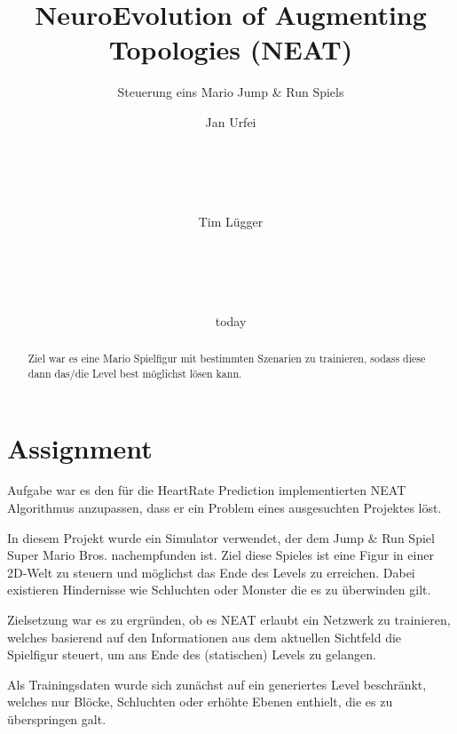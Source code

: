 \documentclass{hbrs-ecta-report}
\begin{document}

\title{NeuroEvolution of Augmenting Topologies (NEAT)}
\subtitle{Steuerung eins Mario Jump \& Run Spiels}

\author{
Jan Urfei\\
       \\
       \\
       \\
       \\
\and
	Tim Lügger\\
	\\
	\\
	\\
	\\
}
\date{today}
\maketitle
\begin{abstract}
Ziel war es eine Mario Spielfigur mit bestimmten Szenarien zu trainieren, sodass diese dann das/die Level best möglichst lösen kann.
\end{abstract}

\section{Assignment}
Aufgabe war es den für die HeartRate Prediction implementierten NEAT Algorithmus\cite{Stanley2002a} anzupassen, dass er ein Problem eines ausgesuchten Projektes löst.

In diesem Projekt wurde ein Simulator verwendet, der dem Jump \& Run Spiel Super Mario Bros. nachempfunden ist.
Ziel diese Spieles ist eine Figur in einer 2D-Welt zu steuern und möglichst das Ende des Levels zu erreichen. Dabei existieren Hindernisse wie Schluchten oder Monster die es zu überwinden gilt. 

Zielsetzung war es zu ergründen, ob es NEAT erlaubt ein Netzwerk zu trainieren, welches basierend auf den Informationen aus dem aktuellen Sichtfeld die Spielfigur steuert, um ans Ende des (statischen) Levels zu gelangen.

Als Trainingsdaten wurde sich zunächst auf ein generiertes Level beschränkt, welches nur Blöcke, Schluchten oder erhöhte Ebenen enthielt, die es zu überspringen galt.
\end{document}

